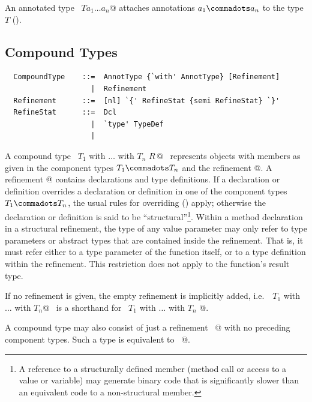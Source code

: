 An annotated type ~$T$\lstinline@ $a_1 \ldots a_n$@
attaches annotations $a_1 \commadots a_n$ to the type $T$
().

\subsection{Compound Types}
\label{sec:compound-types}
\label{sec:refinements}

\syntax\begin{lstlisting}
  CompoundType    ::=  AnnotType {`with' AnnotType} [Refinement]
                    |  Refinement
  Refinement      ::=  [nl] `{' RefineStat {semi RefineStat} `}'
  RefineStat      ::=  Dcl
                    |  `type' TypeDef
                    |
\end{lstlisting}

A compound type ~\lstinline@$T_1$ with $\ldots$ with $T_n$ {$R\,$}@~
represents objects with members as given in the component types $T_1
\commadots T_n$ and the refinement @. A refinement
@ contains declarations and type definitions. 
If a declaration or definition overrides a declaration or definition in
one of the component types $T_1 \commadots T_n$, the usual rules for
overriding () apply; otherwise the declaration
or definition is said to be ``structural''\footnote{A reference to a
structurally defined member (method call or access to a value or
variable) may generate binary code that is significantly slower than
an equivalent code to a non-structural member.}. Within a method
declaration in a structural refinement, the type of any value parameter may only refer
to type parameters or abstract types that are contained inside the refinement. That is,
it must refer either to a type parameter of the function itself, or to
a type definition within the refinement. This restriction does not apply to the
function's result type. 

If no refinement is given, the empty refinement is implicitly added,
i.e.\  ~\lstinline@$T_1$ with $\ldots$ with $T_n$@~ is a shorthand for
~\lstinline@$T_1$ with $\ldots$ with $T_n$ {}@.

A compound type may also consist of just a refinement
~@ with no preceding component types. Such a type is
equivalent to ~@.

